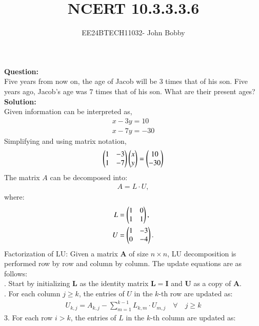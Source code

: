 \documentclass[journal,12pt,onecolumn]{IEEEtran}
\theoremstyle{remark}
\begin{document}

\vspace{3cm}

\title{\textbf{NCERT 10.3.3.3.6}}
\author{EE24BTECH11032- John Bobby}
\maketitle
\bigskip
\textbf{Question:}\\
Five years from now on, the age of Jacob will be $3$ times that of his son. Five years ago, Jacob's age was $7$ times that of his son. What are their present ages?\\
\textbf{Solution:}\\
Given information can be interpreted as,
\begin{align}
    x - 3y = 10\\
    x - 7y = -30
\end{align}
Simplifying and using matrix notation,
\begin{align}
    \begin{pmatrix}
        1 & -3\\
        1 & -7
    \end{pmatrix} \begin{pmatrix}x \\ y\end{pmatrix}= \begin{pmatrix} 10 \\ -30\end{pmatrix}
\end{align}
The matrix $A$ can be decomposed into:
\begin{align}
    A = L \cdot U,
\end{align}
where:
\begin{align}
    L &= \begin{pmatrix}1 & 0 \\ 1 & 1\end{pmatrix}, \\
    U &= \begin{pmatrix}1 & -3 \\ 0 & -4\end{pmatrix}.
\end{align}
\newline
Factorization of LU:\newline
Given a matrix $ \mathbf{A} $ of size $ n \times n $, LU decomposition is performed row by row and column by column. The update equations are as follows: \\ 
. Start by initializing $ \mathbf{L} $ as the identity matrix $ \mathbf{L} = \mathbf{I} $ and $ \mathbf{U} $ as a copy of $ \mathbf{A} $.\\
. For each column $ j \geq k $, the entries of $ U $ in the $ k $-th row are updated as:
\begin{align}
U_{k,j} = A_{k,j} - \sum_{m=1}^{k-1} L_{k,m} \cdot U_{m,j}\quad \forall \quad j \geq k
\end{align}
3. For each row $ i > k $, the entries of $ L $ in the $ k $-th column are updated as:
\end{document}
